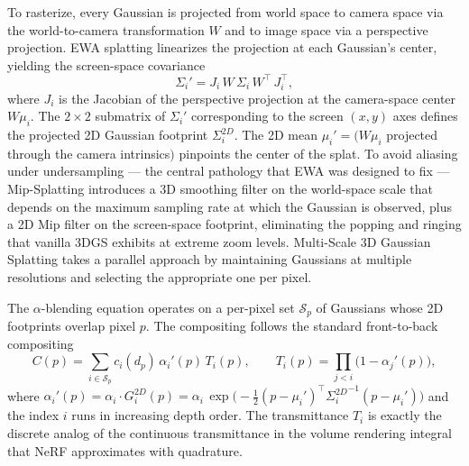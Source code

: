 \documentclass{article}
\begin{document}
To rasterize, every Gaussian is projected from world space to camera space via the world-to-camera transformation \(W\) and to image space via a perspective projection. EWA splatting \cite{zwicker2002ewasplatting} linearizes the projection at each Gaussian's center, yielding the screen-space covariance
\[\Sigma_i' = J_i\,W\,\Sigma_i\,W^{\top}\,J_i^{\top},\]
where \(J_i\) is the Jacobian of the perspective projection at the camera-space center \(W\mu_i\). The \(2\times2\) submatrix of \(\Sigma_i'\) corresponding to the screen \((x,y)\) axes defines the projected 2D Gaussian footprint \(\Sigma_i^{2D}\). The 2D mean \(\mu_i'=(W\mu_i\) projected through the camera intrinsics\()\) pinpoints the center of the splat. To avoid aliasing under undersampling --- the central pathology that EWA was designed to fix --- Mip-Splatting \cite{yu2024mipsplattingaliasf} introduces a 3D smoothing filter on the world-space scale that depends on the maximum sampling rate at which the Gaussian is observed, plus a 2D Mip filter on the screen-space footprint, eliminating the popping and ringing that vanilla 3DGS exhibits at extreme zoom levels. Multi-Scale 3D Gaussian Splatting \cite{yan2024multiscale3dgaussi} takes a parallel approach by maintaining Gaussians at multiple resolutions and selecting the appropriate one per pixel.

The \(\alpha\)-blending equation operates on a per-pixel set \(\mathcal{S}_p\) of Gaussians whose 2D footprints overlap pixel \(p\). The compositing follows the standard front-to-back compositing
\[C(p) = \sum_{i\in\mathcal{S}_p} c_i(d_p)\,\alpha_i'(p)\,T_i(p),\qquad T_i(p) = \prod_{j<i} \big(1 - \alpha_j'(p)\big),\]
where \(\alpha_i'(p) = \alpha_i\cdot G_i^{2D}(p) = \alpha_i\,\exp\!\big(-\tfrac12(p-\mu_i')^{\top}{\Sigma_i^{2D}}^{-1}(p-\mu_i')\big)\) and the index \(i\) runs in increasing depth order. The transmittance \(T_i\) is exactly the discrete analog of the continuous transmittance in the volume rendering integral that NeRF approximates with quadrature.
\end{document}
